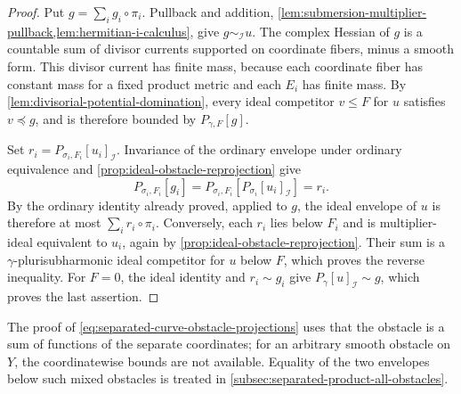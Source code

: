 \begin{proof}
Put $g=\sum_i g_i\circ\pi_i$. Pullback and addition, \cref{lem:submersion-multiplier-pullback,lem:hermitian-i-calculus}, give $g\sim_{\mathcal I}u$. The complex Hessian of $g$ is a countable sum of divisor currents supported on coordinate fibers, minus a smooth form. This divisor current has finite mass, because each coordinate fiber has constant mass for a fixed product metric and each $E_i$ has finite mass. By \cref{lem:divisorial-potential-domination}, every ideal competitor $v\leq F$ for $u$ satisfies $v\preceq g$, and is therefore bounded by $P_{\gamma,F}[g]$.

Set $r_i=P_{\sigma_i,F_i}[u_i]_{\mathcal I}$. Invariance of the ordinary envelope under ordinary equivalence and \cref{prop:ideal-obstacle-reprojection} give
\[
 P_{\sigma_i,F_i}[g_i]
    =P_{\sigma_i,F_i}[P_{\sigma_i}[u_i]_{\mathcal I}]
    =r_i.
\]
By the ordinary identity already proved, applied to $g$, the ideal envelope of $u$ is therefore at most $\sum_i r_i\circ\pi_i$. Conversely, each $r_i$ lies below $F_i$ and is multiplier-ideal equivalent to $u_i$, again by \cref{prop:ideal-obstacle-reprojection}. Their sum is a $\gamma$-plurisubharmonic ideal competitor for $u$ below $F$, which proves the reverse inequality. For $F=0$, the ideal identity and $r_i\sim g_i$ give $P_\gamma[u]_{\mathcal I}\sim g$, which proves the last assertion.
\end{proof}

The proof of \eqref{eq:separated-curve-obstacle-projections} uses that the obstacle is a sum of functions of the separate coordinates; for an arbitrary smooth obstacle on $Y$, the coordinatewise bounds are not available. Equality of the two envelopes below such mixed obstacles is treated in \cref{subsec:separated-product-all-obstacles}.
